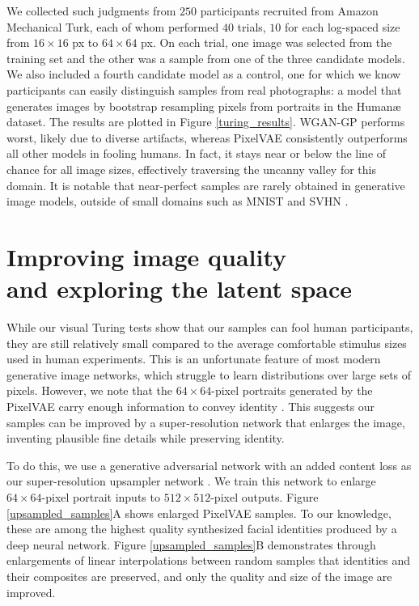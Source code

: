 \documentclass[10pt,letterpaper]{article}
\begin{document}
We collected such judgments from $250$ participants recruited from Amazon Mechanical Turk, each of whom performed $40$ trials, $10$ for each log-spaced size from $16\times16$ px to $64\times64$ px. On each trial, one image was selected from the training set and the other was a sample from one of the three candidate models. We also included a fourth candidate model as a control, one for which we know participants can easily distinguish samples from real photographs: a model that generates images by bootstrap resampling pixels from portraits in the Human{\ae} dataset. The results are plotted in Figure \ref{turing_results}. WGAN-GP performs worst, likely due to diverse artifacts, whereas PixelVAE consistently outperforms all other models in fooling humans. In fact, it stays near or below the line of chance for all image sizes, effectively traversing the uncanny valley for this domain. It is notable that near-perfect samples are rarely obtained in generative image models, outside of small domains such as MNIST \citep{lecun2010mnist} and SVHN \citep{netzer2011reading}. 

\section{Improving image quality\\ and exploring the latent space}

While our visual Turing tests show that our samples can fool human participants, they are still relatively small compared to the average comfortable stimulus sizes used in human experiments. This is an unfortunate feature of most modern generative image networks, which struggle to learn distributions over large sets of pixels. However, we note that the $64\times64$-pixel portraits generated by the PixelVAE carry enough information to convey identity \citep{bachmann1991identification}. This suggests our samples can be improved by a super-resolution network that enlarges the image, inventing plausible fine details while preserving identity.

To do this, we use a generative adversarial network with an added content loss as our super-resolution upsampler network \citep{ledig2016photo}. We train this network to enlarge $64\times64$-pixel portrait inputs to $512\times512$-pixel outputs. Figure \ref{upsampled_samples}A shows enlarged PixelVAE samples. To our knowledge, these are among the highest quality synthesized facial identities produced by a deep neural network. Figure \ref{upsampled_samples}B demonstrates through enlargements of linear interpolations between random samples that identities and their composites are preserved, and only the quality and size of the image are improved.
\end{document}
